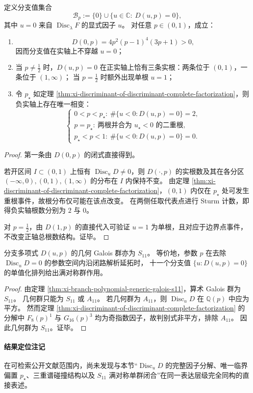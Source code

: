 \begin{theorem}[实分支值的全局拓扑与两相结构]\label{thm:xi-real-branch-topology-two-phase-structure}
定义分支值集合
\[
\mathcal B_p:=\{0\}\cup\{u\in\mathbb C:\ D(u,p)=0\},
\]
其中 \(u=0\) 来自 \(\operatorname{Disc}_{\lambda}F\) 的显式因子 \(u\)。
对任意 \(p\in(0,1)\)，成立：
\begin{enumerate}
  \item
  \[
  D(0,p)=4p^2(p-1)^4(3p+1)>0,
  \]
  因而分支值在实轴上不穿越 \(u=0\)；
  \item 当 \(p\neq\frac12\) 时，\(D(u,p)=0\) 在正实轴上恰有三条实根：两条位于 \((0,1)\)，一条位于 \((1,\infty)\)；
  当 \(p=\frac12\) 时额外出现单根 \(u=1\)；
  \item 令 \(p_\star\) 如定理 \ref{thm:xi-discriminant-of-discriminant-complete-factorization}，则负实轴上存在唯一相变：
  \[
  \begin{cases}
  0<p<p_\star:\ \#\{u<0:D(u,p)=0\}=2,\\
  p=p_\star:\ \text{两根并合为 }u_\star<0\text{ 的二重根},\\
  p_\star<p<1:\ \#\{u<0:D(u,p)=0\}=0.
  \end{cases}
  \]
\end{enumerate}
\end{theorem}
\begin{proof}
第一条由 \(D(0,p)\) 的闭式直接得到。

若开区间 \(I\subset(0,1)\) 上恒有 \(\operatorname{Disc}_uD\neq0\)，则 \(D(\cdot,p)\) 的实根数及其在各分区
\((-\infty,0),(0,1),(1,\infty)\) 的分布在 \(I\) 内保持不变。
由定理 \ref{thm:xi-discriminant-of-discriminant-complete-factorization}，\((0,1)\) 内仅在 \(p_\star\) 处可发生重根事件，故根分布仅可能在该点改变。
在两侧任取代表点进行 Sturm 计数，即得负实轴根数分别为 \(2\) 与 \(0\)。

对 \(p=\frac12\)，由 \(D(1,p)\) 的直接代入可验证 \(u=1\) 为单根，且对应于边界点事件，不改变正轴总根数结构。证毕。
\end{proof}

\begin{corollary}[分支值延拓的满对称单群作用]\label{cor:xi-full-symmetric-geometric-monodromy-s11}
分支多项式 \(D(u,p)\) 的几何 Galois 群亦为 \(S_{11}\)。
等价地，参数 \(p\) 在去除 \(\operatorname{Disc}_uD=0\) 的参数空间内沿闭路解析延拓时，
十一个分支值 \(\{u:D(u,p)=0\}\) 的单值化排列给出满对称群作用。
\end{corollary}
\begin{proof}
由定理 \ref{thm:xi-branch-polynomial-generic-galois-s11}，算术 Galois 群为 \(S_{11}\)。
几何群只能为 \(S_{11}\) 或 \(A_{11}\)。
若几何群为 \(A_{11}\)，则 \(\operatorname{Disc}_uD\) 在 \(\mathbb Q(p)\) 中应为平方。
然而定理 \ref{thm:xi-discriminant-of-discriminant-complete-factorization} 的分解中
\(
F_8(p)^1
\)
与
\(
G_{16}(p)^3
\)
均为奇指数因子，故判别式非平方，排除 \(A_{11}\)。
因此几何群为 \(S_{11}\)。证毕。
\end{proof}

\paragraph{结果定位注记}
在可检索公开文献范围内，尚未发现与本节“\(\operatorname{Disc}_uD\) 的完整因子分解、唯一临界偏置 \(p_\star\)、三重谱碰撞结构以及 \(S_{11}\) 满对称单群闭合”在同一表达层级完全同构的直接表述。

\endinput
